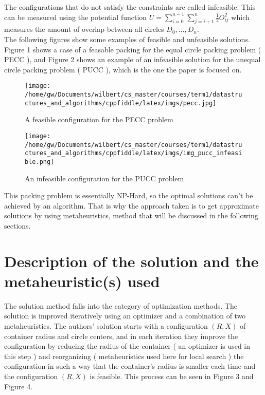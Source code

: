 \documentclass{article}
\begin{document}
The configurations that do not satisfy the constraints are called infeasible. This can be measured using the potential function $U=\sum\limits_{i=0}^{n-1}\sum\limits_{j=i+1}^{n}\frac{1}{2}O_{ij}^{2}$ which measures the amount of overlap between all circles $D_{0},\hdots,D_{n}$.\\

The following figures show some examples of feasible and unfeasible solutions. Figure 1 shows a case of a feasable packing for the equal circle packing problem ( PECC ), and Figure 2 shows an example of an infeasible solution for the unequal circle packing problem ( PUCC ), which is the one the paper is focused on.

\begin{figure}[H]
	\centering
	\texttt{[image: /home/gw/Documents/wilbert/cs\_master/courses/term1/datastructures\_and\_algorithms/cppfiddle/latex/imgs/pecc.jpg]}
	\caption{A feasible configuration for the PECC problem}
	\label{fig:img_pecc}
\end{figure}

\begin{figure}[H]
	\centering
	\texttt{[image: /home/gw/Documents/wilbert/cs\_master/courses/term1/datastructures\_and\_algorithms/cppfiddle/latex/imgs/img\_pucc\_infeasible.png]}
	\caption{An infeasible configuration for the PUCC problem}
	\label{fig:img_pecc}
\end{figure}


This packing problem is essentially NP-Hard, so the optimal solutions can't be achieved by an algorithm. That is why the approach taken is to get approximate solutions by using metaheuristics, method that will be discussed in the following sections.\\



\section{Description of the solution and the metaheuristic(s) used}\label{sec:solution}%
The solution method falls into the category of optimization methods. The solution is improved iteratively using an optimizer and a combination of two metaheuristics. The authors' solution starts with a configuration $(R,X)$ of container radius and circle centers, and in each iteration they improve the configuration by reducing the radius of the container ( an optimizer is used in this step ) and reorganizing ( metaheuristics used here for local search ) the configuration in such a way that the container's radius is smaller each time and the configuration $(R,X)$ is feasible. This process can be seen in Figure 3 and Figure 4.\\
\end{document}
